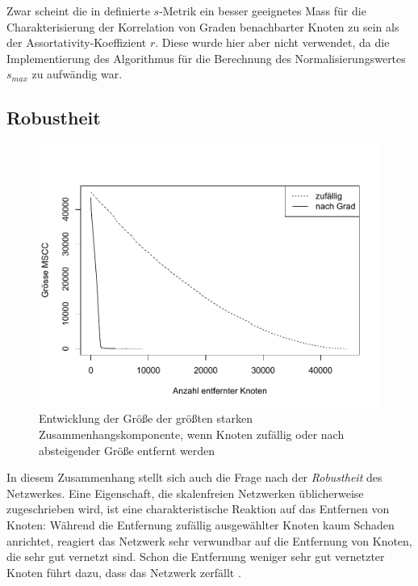 Zwar scheint die in \cite{Li2005} definierte $s$-Metrik ein besser
geeignetes Mass für die Charakterisierung der Korrelation von Graden
benachbarter Knoten zu sein als der Assortativity-Koeffizient
$r$. Diese wurde hier aber nicht verwendet, da die Implementierung des
Algorithmus für die Berechnung des Normalisierungswertes $s_{max}$ zu
aufwändig war.

\subsection{Robustheit}
\label{sec:robustheit}

\begin{figure}[ht!]
  \centering
  \includegraphics[scale=0.45]{images/without.pdf}
  \caption{Entwicklung der Größe der größten starken
    Zusammenhangskomponente, wenn Knoten zufällig oder nach absteigender
    Größe entfernt werden}
  \label{fig:without}
\end{figure}

In diesem Zusammenhang stellt sich auch die Frage nach der
\emph{Robustheit} des Netzwerkes.  Eine Eigenschaft, die skalenfreien
Netzwerken üblicherweise zugeschrieben wird, ist eine
charakteristische Reaktion auf das Entfernen von Knoten: Während die
Entfernung zufällig ausgewählter Knoten kaum Schaden anrichtet,
reagiert das Netzwerk sehr verwundbar auf die Entfernung von Knoten,
die sehr gut vernetzt sind. Schon die Entfernung weniger sehr gut
vernetzter Knoten führt dazu, dass das Netzwerk
zerfällt \cite{Albert2000}.

